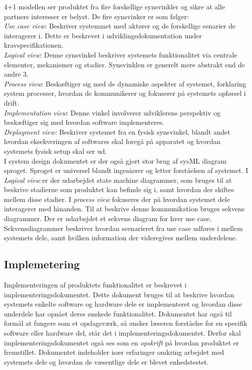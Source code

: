 	4+1 modellen ser produktet fra fire forskellige synsvinkler og sikre at alle partners interesser er belyst. De fire synsvinker er som følger: 
	\\ \textit{Use case view}: Beskriver systemmet med aktører og de forskellige senarier de interagerer i. Dette er beskrevet i udviklingsdokumentation under kravspecifikationen.\\
	\textit{Logical view}: Denne synsvinkel beskriver systemets funktionalitet via centrale elementer, mekanismer og stadier. Synsvinklen er generelt mere abstrakt end de andre 3. \\
	\textit{Process view}: Beskæftiger sig med de dynamiske aspekter af systemet, forklaring system processer, hvordan de kommunikerer og fokuserer på systemets opførsel i drift. \\
	\textit{Implementation view}: Denne vinkel involverer udviklerens perspektiv og beskæftiger sig med hvordan software implementeres. \\
	\textit{Deployment view:} Beskriver systemet fra en fysisk synsvinkel, blandt andet hvordan eksekveringen af softwares skal foregå på apparatet og hvordan systemets fysisk setup skal ser ud. \\
	
	I system design dokumentet er der også gjort stor brug af sysML diagram sproget. Sproget er universel blandt ingeniører og letter forståelsen af systemet. I \textit{Logical view} er der udarbejdet state machine diagrammer, som bruges til at beskrive stadierne som produktet kan befinde sig i, samt hvordan der skiftes mellem disse stadier. I \textit{process view} fokuseres der på hvordan systemet dele interagerer med hinanden. Til at beskrive denne kommunikation bruges sekvens diagrammer. Der er udarbejdet et sekvens diagram for hver use case. Sekvensdiagrammer beskriver hvordan scenarieret fra use case udføres i mellem systemets dele, samt hvilken information der videregives mellem underdelene. 
	
	\subsection{Implemetering} \label{title:implementering}
	Implementeringen af produktets funktionalitet er beskrevet i implementeringsdokumentet. Dette dokument bruges til at beskrive hvordan systemets enkelte software og hardware dele er implementeret og hvordan disse underdele har opnået deres ønskede funktionalitet. Dokumentet har også til formål at fungere som et opslagsværk, så ønsker læseren forståelse for en specifik software eller hardware del, står det i implementeringsdokumentet. Derfor skal implementeringsdokumentet også ses som en \textit{opskrift} på hvordan produktet er fremstillet. Dokumentet indeholder især erfaringer omkring arbejdet med systemets dele og hvordan de væsentlige dele er blevet enhedstestet. 


